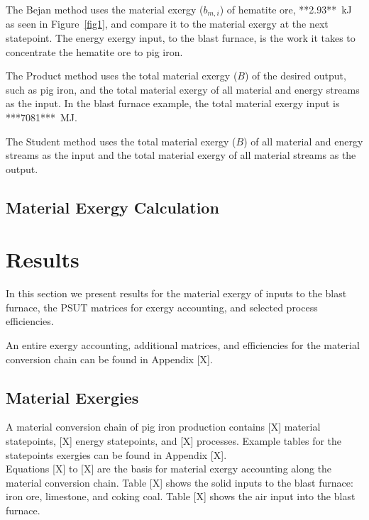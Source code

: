 \documentclass[energies,article,submit,pdftex,moreauthors]{Definitions/mdpi}
\begin{document}
The Bejan method uses the material exergy ($b_{m,i}$)
of hematite ore, **2.93**~kJ as seen in Figure~\ref{fig1},
and compare it to the material exergy
at the next statepoint.
The energy exergy input,
to the blast furnace,
is the work it takes
to concentrate the hematite ore
to pig iron.

The Product method uses the total material exergy ($B$)
of the desired output,
such as pig iron,
and the total material exergy
of all material and energy streams
as the input.
In the blast furnace example,
the total material exergy input
is ***7081***~MJ.

The Student method uses the total material exergy ($B$)
of all material and energy streams
as the input
and the total material exergy
of all material streams
as the output.

\subsection{Material Exergy Calculation}



\section{Results}
\label{sec:results}

In this section we present results
for the material exergy
of inputs to the blast furnace,
the PSUT matrices for exergy accounting,
and selected process efficiencies.

An entire exergy accounting,
additional matrices,
and efficiencies
for the material conversion chain
can be found in Appendix [X].
\subsection{Material Exergies}
\label{ssec: blast furnace example}

A material conversion chain
of pig iron production
contains [X] material statepoints,
[X] energy statepoints,
and [X] processes.
Example tables for the statepoints exergies
can be found in Appendix [X].\\

Equations [X] to [X] are the basis for material exergy accounting
along the material conversion chain.
Table [X] shows the solid inputs
to the blast furnace: iron ore, limestone, and coking coal.
Table [X] shows the air input
into the blast furnace.
\end{document}
